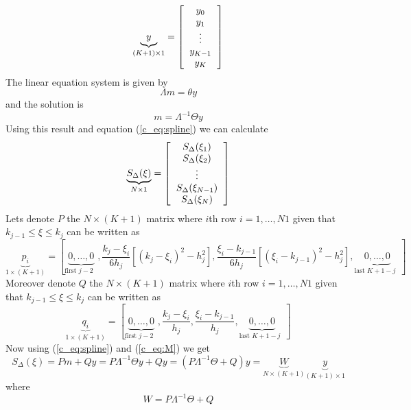 \documentclass[12pt]{article}
\begin{document}
\begin{equation}
\underbrace{y}_{(K+1) \times 1}=\left[
\begin{tabular}{c}
$y_0$ \\
$y_1$ \\
$\vdots$ \\
$y_{K-1}$ \\
$y_{K}$ \\
\end{tabular} \right]
\end{equation}
The linear equation system is given by 
\begin{equation}
\Lambda m = \theta y 
\end{equation}
and the solution is 
\begin{equation}
m =\Lambda^{-1}  \Theta y
\label{c_eq:M} 
\end{equation}
Using this result and equation (\ref{c_eq:spline}) we can calculate 
\begin{equation}
\underbrace{S_{\Delta}(\xi)}_{N\times 1}=\left[
\begin{tabular}{c}
$S_{\Delta}(\xi_1)$ \\
$S_{\Delta}(\xi_2)$ \\
$\vdots$ \\
$S_{\Delta}(\xi_{N-1})$ \\
$S_{\Delta}(\xi_N)$ \\
\end{tabular} \right]
\end{equation}
Lets denote $P$ the $N \times (K+1)$ matrix where $i$th row $i=1, \ldots , N1$ given that $k_{j-1} \leq \xi \leq k_{j}$ can be written as 
\begin{equation}
\underbrace{p_i }_{1 \times (K+1)}= \left[\underbrace{0 , \ldots, 0}_{\text{first $j-2$ }}, \frac{k_j - \xi_i}{6 h_j} \left[(k_j - \xi_i)^2 - h^{2}_j  \right],  \frac{\xi_i -k_{j-1} }{6 h_j} \left[(\xi_i -k_{j-1})^2 - h^{2}_j  \right],\underbrace{0 , \ldots, 0}_{\text{last $K+1-j$ }} \right] \nonumber
\end{equation} 
Moreover denote $Q$ the $N \times (K+1)$ matrix where $i$th row $i=1, \ldots , N1$ given that $k_{j-1} \leq \xi \leq k_{j}$ can be written as 
\begin{equation}
\underbrace{q_i }_{1 \times (K+1)}= \left[\underbrace{0 , \ldots, 0}_{\text{first $j-2$ }}, \frac{k_j - \xi_i}{ h_j} ,  \frac{\xi_i -k_{j-1} }{ h_j} ,\underbrace{0 , \ldots, 0}_{\text{last $K+1-j$ }} \right] 
\end{equation} 
Now using (\ref{c_eq:spline}) and (\ref{c_eq:M}) we get 
\begin{equation}
S_{\Delta}(\xi)=Pm+Qy=P\Lambda^{-1}  \Theta y + Qy = (P\Lambda^{-1}  \Theta + Q)y=\underbrace{W}_{N\times (K+1)} \underbrace{y}_{ (K+1)\times 1}
\end{equation}
where 
\begin{equation}
W =P\Lambda^{-1}  \Theta + Q
\end{equation}
\end{document}
